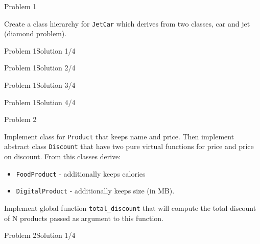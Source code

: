 
\begin{frame}{Problem 1}

Create a class hierarchy for \texttt{JetCar} which derives from two classes, car and jet
(diamond problem).

\end{frame}

\begin{frame}[fragile]{Problem 1}{Solution 1/4}

\end{frame}

\begin{frame}[fragile]{Problem 1}{Solution 2/4}

\end{frame}

\begin{frame}[fragile]{Problem 1}{Solution 3/4}

\end{frame}

\begin{frame}[fragile]{Problem 1}{Solution 4/4}

\end{frame}

\begin{frame}{Problem 2}
\begin{scriptsize}
Implement class for \texttt{Product} that keeps name and price. Then implement
abstract class \texttt{Discount} that have two pure virtual functions for price
and price on discount. From this classes derive:

\begin{itemize}
  \item \texttt{FoodProduct} - additionally keeps calories
  \item \texttt{DigitalProduct} - additionally keeps size (in MB).
\end{itemize}

Implement global function \texttt{total\_discount} that will compute the total
discount of N products passed as argument to this function.


\end{scriptsize}
 
\end{frame}

\begin{frame}[fragile]{Problem 2}{Solution 1/4}

\end{frame}

